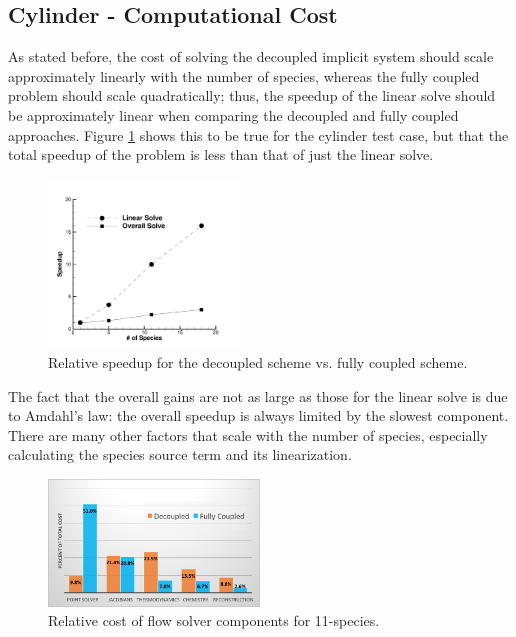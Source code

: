 \subsection{Cylinder - Computational Cost}
\label{sec:cylinder-comp-cost}

As stated before, the cost of solving the decoupled implicit system should scale
approximately linearly with the number of species, whereas the fully coupled
problem should scale quadratically; thus, the speedup of the linear solve
should be approximately linear when comparing the decoupled and fully coupled
approaches.  Figure \ref{rel_speedup} shows this to be true for the cylinder test
case, but that the total speedup of the problem is less than that of just
the linear solve.
\begin{figure}[h]
  \centering
  \includegraphics[width=0.45\textwidth]{figures/scitech/speedup} 
  \caption{ Relative speedup for the decoupled scheme vs. fully coupled scheme.}
  \label{rel_speedup} 
\end{figure}
The fact that the overall gains are not as large as those for the linear
solve is due to Amdahl's law: the overall speedup is always limited by the
slowest component.  There are many other factors that scale with the number of
species, especially calculating the species source term and its linearization.
\begin{figure}[h]
  \centering
  \includegraphics[width=0.5\textwidth]{figures/flow-efficiency/percent-cost.png}
  \caption{Relative cost of flow solver components for 11-species.}
  \label{fig:percent-cost-cyl}
\end{figure}
